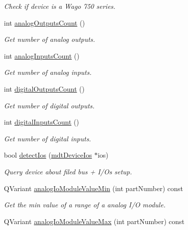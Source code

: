 \begin{DoxyCompactItemize}
\begin{DoxyCompactList}\small\item\em Check if device is a Wago 750 series. \end{DoxyCompactList}\item 
int \hyperlink{classmdt_device_modbus_wago_ad812b7ee3a2f2677cddde205da5ec787}{analogOutputsCount} ()
\begin{DoxyCompactList}\small\item\em Get number of analog outputs. \end{DoxyCompactList}\item 
int \hyperlink{classmdt_device_modbus_wago_a9da56c13404fd9243c5920ff2ef8bd15}{analogInputsCount} ()
\begin{DoxyCompactList}\small\item\em Get number of analog inputs. \end{DoxyCompactList}\item 
int \hyperlink{classmdt_device_modbus_wago_a6711c4e486c3b103b187102685e091cc}{digitalOutputsCount} ()
\begin{DoxyCompactList}\small\item\em Get number of digital outputs. \end{DoxyCompactList}\item 
int \hyperlink{classmdt_device_modbus_wago_ad51fd45858e62c597ba8fc2bf3e877bd}{digitalInputsCount} ()
\begin{DoxyCompactList}\small\item\em Get number of digital inputs. \end{DoxyCompactList}\item 
bool \hyperlink{classmdt_device_modbus_wago_a03b04618bbf1a89e936bc541f6375baf}{detectIos} (\hyperlink{classmdt_device_ios}{mdtDeviceIos} $\ast$ios)
\begin{DoxyCompactList}\small\item\em Query device about filed bus + I/Os setup. \end{DoxyCompactList}\item 
QVariant \hyperlink{classmdt_device_modbus_wago_ac416f77ab0f21d967adfbd6ca92adc9f}{analogIoModuleValueMin} (int partNumber) const 
\begin{DoxyCompactList}\small\item\em Get the min value of a range of a analog I/O module. \end{DoxyCompactList}\item 
QVariant \hyperlink{classmdt_device_modbus_wago_a2a1c3cf2a830a819d906775eea9633c1}{analogIoModuleValueMax} (int partNumber) const 

\end{DoxyCompactItemize}
